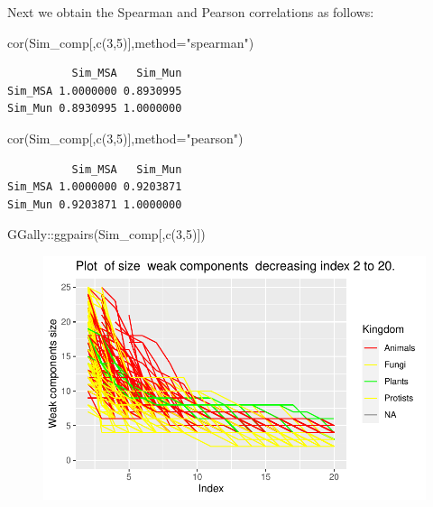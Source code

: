 \documentclass[
  letterpaper,
  DIV=11,
  numbers=noendperiod]{scrreprt}
\newenvironment{Shaded}{}{}
\newcommand{\AttributeTok}[1]{\textcolor[rgb]{0.78,0.47,0.87}{#1}}
\newcommand{\DecValTok}[1]{\textcolor[rgb]{0.82,0.60,0.40}{#1}}
\newcommand{\FunctionTok}[1]{\textcolor[rgb]{0.38,0.69,0.94}{#1}}
\newcommand{\NormalTok}[1]{\textcolor[rgb]{0.67,0.70,0.75}{#1}}
\newcommand{\SpecialCharTok}[1]{\textcolor[rgb]{0.34,0.71,0.76}{#1}}
\newcommand{\StringTok}[1]{\textcolor[rgb]{0.60,0.76,0.47}{#1}}
\begin{document}
Next we obtain the Spearman and Pearson correlations as follows:

\begin{Shaded}
\begin{Highlighting}[]
\FunctionTok{cor}\NormalTok{(Sim\_comp[,}\FunctionTok{c}\NormalTok{(}\DecValTok{3}\NormalTok{,}\DecValTok{5}\NormalTok{)],}\AttributeTok{method=}\StringTok{"spearman"}\NormalTok{)}
\end{Highlighting}
\end{Shaded}

\begin{verbatim}
          Sim_MSA   Sim_Mun
Sim_MSA 1.0000000 0.8930995
Sim_Mun 0.8930995 1.0000000
\end{verbatim}

\begin{Shaded}
\begin{Highlighting}[]
\FunctionTok{cor}\NormalTok{(Sim\_comp[,}\FunctionTok{c}\NormalTok{(}\DecValTok{3}\NormalTok{,}\DecValTok{5}\NormalTok{)],}\AttributeTok{method=}\StringTok{"pearson"}\NormalTok{)}
\end{Highlighting}
\end{Shaded}

\begin{verbatim}
          Sim_MSA   Sim_Mun
Sim_MSA 1.0000000 0.9203871
Sim_Mun 0.9203871 1.0000000
\end{verbatim}

\begin{Shaded}
\begin{Highlighting}[]
\NormalTok{GGally}\SpecialCharTok{::}\FunctionTok{ggpairs}\NormalTok{(Sim\_comp[,}\FunctionTok{c}\NormalTok{(}\DecValTok{3}\NormalTok{,}\DecValTok{5}\NormalTok{)])}
\end{Highlighting}
\end{Shaded}

\begin{figure}[H]

{\centering \includegraphics[width=1\textwidth,height=\textheight]{index_files/figure-pdf/unnamed-chunk-52-1.pdf}

}

\end{figure}
\end{document}
